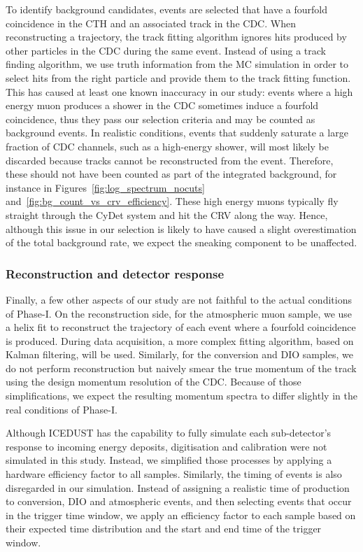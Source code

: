 To identify background candidates, events are selected that have a fourfold
coincidence in the CTH and an associated track in the CDC. When reconstructing a
trajectory, the track fitting algorithm ignores hits produced by other particles
in the CDC during the same event. Instead of using a track finding algorithm, we
use truth information from the MC simulation in order to select hits from the
right particle and provide them to the track fitting function. This has caused
at least one known inaccuracy in our study: events where a high energy muon
produces a shower in the CDC sometimes induce a fourfold coincidence, thus they
pass our selection criteria and may be counted as background events. In
realistic conditions, events that suddenly saturate a large fraction of CDC
channels, such as a high-energy shower, will most likely be discarded because
tracks cannot be reconstructed from the event. Therefore, these should not have
been counted as part of the integrated background, for instance in
Figures~\ref{fig:log_spectrum_nocuts} and~\ref{fig:bg_count_vs_crv_efficiency}.
These high energy muons typically fly straight through the CyDet system and hit
the CRV along the way. Hence, although this issue in our selection is likely to
have caused a slight overestimation of the total background rate, we expect the
sneaking component to be unaffected.

\subsubsection{Reconstruction and detector response}
Finally, a few other aspects of our study are not faithful to the actual conditions of
Phase-I. On the reconstruction side, for the atmospheric muon sample, we use a
helix fit to reconstruct the trajectory of each event where a fourfold
coincidence is produced. During data acquisition, a more complex fitting
algorithm, based on Kalman filtering, will be used. Similarly, for the
conversion and DIO samples, we do not perform reconstruction but naively
smear the true momentum of the track using the design momentum resolution of the
CDC. Because of those simplifications, we expect the resulting momentum spectra
to differ slightly in the real conditions of Phase-I. 

Although ICEDUST has the capability to fully simulate each sub-detector's
response to incoming energy deposits, digitisation and calibration were not
simulated in this study. Instead, we simplified those processes by applying a
hardware efficiency factor to all samples. Similarly, the timing of events is
also disregarded in our simulation. Instead of assigning a realistic time of
production to conversion, DIO and atmospheric events, and then selecting events
that occur in the trigger time window, we apply an efficiency factor to each
sample based on their expected time distribution and the start and end time of
the trigger window. 

